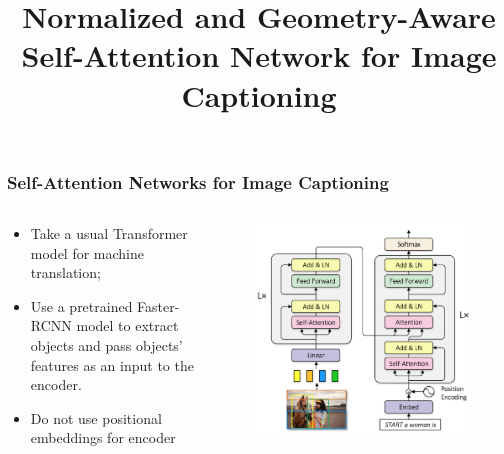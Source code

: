 \documentclass[10pt]{beamer}
\title{Normalized and Geometry-Aware Self-Attention Network for Image Captioning}
\begin{document}
\begin{frame}
    \titlepage
\end{frame}

\begin{frame}
\frametitle{Self-Attention Networks for Image Captioning}

\begin{columns}
\begin{column}{0.5\textwidth}
\begin{itemize}
    \item\pause Take a usual Transformer model for machine translation;
    \item\pause Use a pretrained Faster-RCNN model to extract objects and pass objects' features as an input to the encoder.
    \item\pause Do not use positional embeddings for encoder
\end{itemize}
\end{column}
\begin{column}{0.5\textwidth}
\pause
\begin{figure}
    \centering
    \includegraphics[width=\textwidth]{images/san.png}
\end{figure}
\end{column}
\end{columns}

\end{frame}
\end{document}
